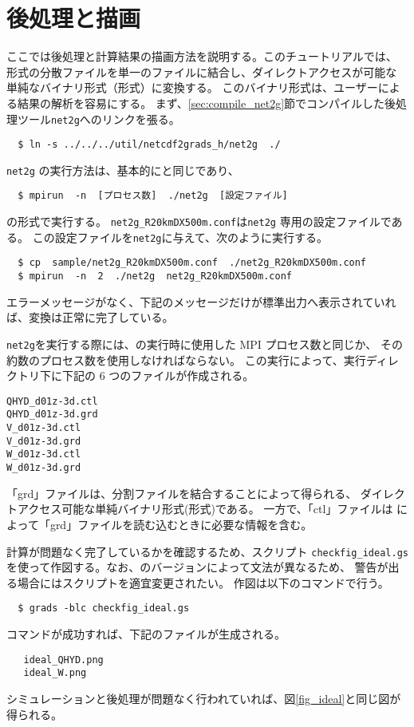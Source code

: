 \section{後処理と描画} \label{sec:ideal_exp_net2g}
ここでは後処理と計算結果の描画方法を説明する。このチュートリアルでは、
{\netcdf}形式の分散ファイルを単一のファイルに結合し、ダイレクトアクセスが可能な
単純なバイナリ形式（\grads 形式）に変換する。
このバイナリ形式は、ユーザーによる結果の解析を容易にする。
まず、\ref{sec:compile_net2g}節でコンパイルした後処理ツール\verb|net2g|へのリンクを張る。
\begin{verbatim}
  $ ln -s ../../../util/netcdf2grads_h/net2g  ./
\end{verbatim}

\verb|net2g| の実行方法は、基本的に{\scalerm}と同じであり、
\begin{verbatim}
  $ mpirun  -n  [プロセス数]  ./net2g  [設定ファイル]
\end{verbatim}
の形式で実行する。
\verb|net2g_R20kmDX500m.conf|は\verb|net2g| 専用の設定ファイルである。
この設定ファイルを\verb|net2g|に与えて、次のように実行する。
\begin{verbatim}
  $ cp  sample/net2g_R20kmDX500m.conf  ./net2g_R20kmDX500m.conf
  $ mpirun  -n  2  ./net2g  net2g_R20kmDX500m.conf
\end{verbatim}
エラーメッセージがなく、下記のメッセージだけが標準出力へ表示されていれば、変換は正常に完了している。

\verb|net2g|を実行する際には、{\scalerm}の実行時に使用した MPI プロセス数と同じか、
その約数のプロセス数を使用しなければならない。
この実行によって、実行ディレクトリ下に下記の 6 つのファイルが作成される。
\begin{alltt}
  QHYD_d01z-3d.ctl
  QHYD_d01z-3d.grd
  V_d01z-3d.ctl
  V_d01z-3d.grd
  W_d01z-3d.ctl
  W_d01z-3d.grd
\end{alltt}
「grd」ファイルは、分割ファイルを結合することによって得られる、
ダイレクトアクセス可能な単純バイナリ形式(\grads 形式)である。
一方で、「ctl」ファイルは \grads によって「grd」ファイルを読む込むときに必要な情報を含む。

計算が問題なく完了しているかを確認するため、\grads スクリプト \verb|checkfig_ideal.gs|
を使って作図する。なお、\grads のバージョンによって文法が異なるため、
警告が出る場合には\grads スクリプトを適宜変更されたい。
作図は以下のコマンドで行う。
\begin{verbatim}
  $ grads -blc checkfig_ideal.gs
\end{verbatim}
コマンドが成功すれば、下記のファイルが生成される。
\begin{verbatim}
   ideal_QHYD.png
   ideal_W.png
\end{verbatim}
シミュレーションと後処理が問題なく行われていれば、図\ref{fig_ideal}と同じ図が得られる。

